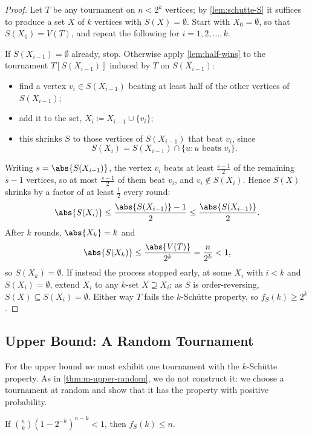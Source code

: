 \begin{proof}
    Let \(T\) be any tournament on \(n < 2^k\) vertices; by \autoref{lem:schutte-S} it suffices to produce a set \(X\) of \(k\) vertices with \(S(X) = \emptyset\). Start with \(X_0 = \emptyset\), so that \(S(X_0) = V(T)\), and repeat the following for \(i = 1, 2, \ldots, k\).

    If \(S(X_{i-1}) = \emptyset\) already, stop. Otherwise apply \autoref{lem:half-wins} to the tournament \(T[S(X_{i-1})]\) induced by \(T\) on \(S(X_{i-1})\):
    \begin{itemize}
        \item find a vertex \(v_i \in S(X_{i-1})\) beating at least half of the other vertices of \(S(X_{i-1})\);
        \item add it to the set, \(X_i \coloneqq X_{i-1} \cup \{v_i\}\);
        \item this shrinks \(S\) to those vertices of \(S(X_{i-1})\) that beat \(v_i\), since
        \[
            S(X_i) = S(X_{i-1}) \cap \{u : u \text{ beats } v_i\}.
        \]
    \end{itemize}
    Writing \(s = \abs{S(X_{i-1})}\), the vertex \(v_i\) beats at least \(\frac{s-1}{2}\) of the remaining \(s - 1\) vertices, so at most \(\frac{s-1}{2}\) of them beat \(v_i\), and \(v_i \notin S(X_i)\). Hence \(S(X)\) shrinks by a factor of at least \(\frac{1}{2}\) every round:
    \[
        \abs{S(X_i)} \le \frac{\abs{S(X_{i-1})} - 1}{2} \le \frac{\abs{S(X_{i-1})}}{2}.
    \]
    After \(k\) rounds, \(\abs{X_k} = k\) and
    \[
        \abs{S(X_k)} \le \frac{\abs{V(T)}}{2^k} = \frac{n}{2^k} < 1,
    \]
    so \(S(X_k) = \emptyset\). If instead the process stopped early, at some \(X_i\) with \(i < k\) and \(S(X_i) = \emptyset\), extend \(X_i\) to any \(k\)-set \(X \supseteq X_i\); as \(S\) is order-reversing, \(S(X) \subseteq S(X_i) = \emptyset\). Either way \(T\) fails the \(k\)-Sch\"utte property, so \(f_S(k) \ge 2^k\).
\end{proof}

\subsection{Upper Bound: A Random Tournament}

For the upper bound we must exhibit one tournament with the \(k\)-Sch\"utte property. As in \autoref{thm:m-upper-random}, we do not construct it: we choose a tournament at random and show that it has the property with positive probability.

\begin{theorem}[Erd\H{o}s]\label{thm:fs-upper}
    If \(\binom{n}{k} \left( 1 - 2^{-k} \right)^{n-k} < 1\), then \(f_S(k) \le n\).
\end{theorem}

